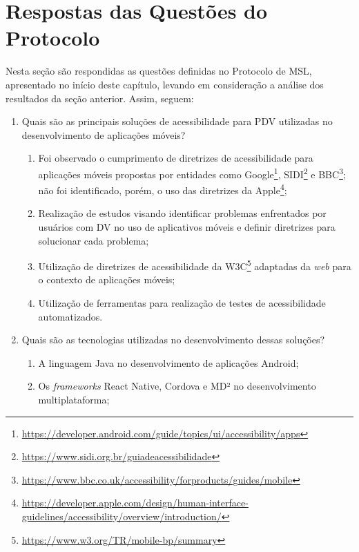 \section{Respostas das Questões do Protocolo}

Nesta seção são respondidas as questões definidas no Protocolo de MSL, apresentado no início deste capítulo, levando em consideração a análise dos resultados da seção anterior.
Assim, seguem:

\begin{enumerate}
      \item Quais são as principais soluções de acessibilidade para PDV utilizadas
            no desenvolvimento de aplicações móveis?
            \begin{enumerate}
                  \item Foi observado o cumprimento de diretrizes de acessibilidade para aplicações móveis propostas por entidades
                        como Google\footnote{\url{https://developer.android.com/guide/topics/ui/accessibility/apps}},
                        SIDI\footnote{\url{https://www.sidi.org.br/guiadeacessibilidade}} e
                        BBC\footnote{\url{https://www.bbc.co.uk/accessibility/forproducts/guides/mobile}}; não foi identificado, porém, o uso das diretrizes da
                        Apple\footnote{\url{https://developer.apple.com/design/human-interface-guidelines/accessibility/overview/introduction/}};
                  \item Realização de estudos visando identificar problemas enfrentados por usuários com DV no uso de aplicativos móveis e definir diretrizes para solucionar cada problema;
                  \item Utilização de diretrizes de acessibilidade da W3C\footnote{\url{https://www.w3.org/TR/mobile-bp/summary}} adaptadas da \emph{web} para o contexto de aplicações móveis;
                  \item Utilização de ferramentas para realização de testes de acessibilidade automatizados.
            \end{enumerate}
      \item Quais são as tecnologias utilizadas no desenvolvimento dessas soluções?
            \begin{enumerate}
                  \item A linguagem Java no desenvolvimento de aplicações Android;
                  \item Os \emph{frameworks} React Native, Cordova e MD² no desenvolvimento multiplataforma;

\end{enumerate}
\end{enumerate}
